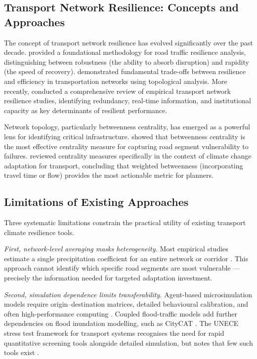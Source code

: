 \documentclass[review]{elsarticle}
\begin{document}
\subsection{Transport Network Resilience: Concepts and Approaches}
\label{sec:lit:resilience}

The concept of transport network resilience has evolved significantly over the past decade. \citet{calvert2018methodology} provided a foundational methodology for road traffic resilience analysis, distinguishing between robustness (the ability to absorb disruption) and rapidity (the speed of recovery). \citet{ganin2017resilience} demonstrated fundamental trade-offs between resilience and efficiency in transportation networks using topological analysis. More recently, \citet{bergantino2024assessing} conducted a comprehensive review of empirical transport network resilience studies, identifying redundancy, real-time information, and institutional capacity as key determinants of resilient performance.

Network topology, particularly betweenness centrality, has emerged as a powerful lens for identifying critical infrastructure. \citet{wassmer2024resilience} showed that betweenness centrality is the most effective centrality measure for capturing road segment vulnerability to failures. \citet{stamos2023centrality} reviewed centrality measures specifically in the context of climate change adaptation for transport, concluding that weighted betweenness (incorporating travel time or flow) provides the most actionable metric for planners.

\subsection{Limitations of Existing Approaches}
\label{sec:lit:limits}

Three systematic limitations constrain the practical utility of existing transport climate resilience tools.

\textit{First, network-level averaging masks heterogeneity.} Most empirical studies estimate a single precipitation coefficient for an entire network or corridor \citep{hranac2006empirical,bi2022weather}. This approach cannot identify which specific road segments are most vulnerable --- precisely the information needed for targeted adaptation investment.

\textit{Second, simulation dependence limits transferability.} Agent-based microsimulation models require origin--destination matrices, detailed behavioural calibration, and often high-performance computing \citep{huang2022overview}. Coupled flood-traffic models add further dependencies on flood inundation modelling, such as CityCAT \citep{pregnolato2017depth,he2026flood}. The UNECE stress test framework for transport systems recognises the need for rapid quantitative screening tools alongside detailed simulation, but notes that few such tools exist \citep{unece2024stress}.
\end{document}

